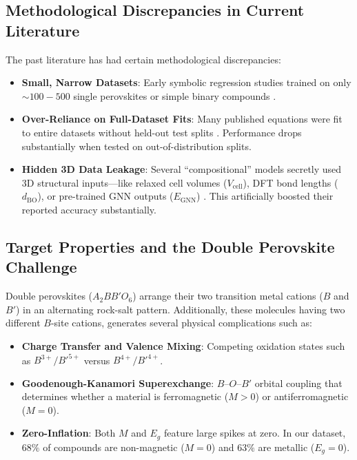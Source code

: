 \documentclass[12pt,onecolumn]{elsarticle}
\begin{document}
\subsection{Methodological Discrepancies in Current Literature}
The past literature has had certain methodological discrepancies:
\begin{itemize}
\item \textbf{Small, Narrow Datasets}: Early symbolic regression studies trained on only $\sim 100 - 500$ single perovskites or simple binary compounds \cite{ghiringhelli2015bigdata, bartel2019new}.
\item \textbf{Over-Reliance on Full-Dataset Fits}: Many published equations were fit to entire datasets without held-out test splits \cite{ouyang2018sisso, ghiringhelli2015bigdata, rissanen1978modeling}. Performance drops substantially when tested on out-of-distribution splits.
\item \textbf{Hidden 3D Data Leakage}: Several ``compositional'' models secretly used 3D structural inputs—like relaxed cell volumes ($V_{\text{cell}}$), DFT bond lengths ($d_{\text{BO}}$), or pre-trained GNN outputs ($E_{\text{GNN}}$) \cite{chgnet, kirklin2015open, hautier2012accuracy}. This artificially boosted their reported accuracy substantially.
\end{itemize}

\subsection{Target Properties and the Double Perovskite Challenge}
Double perovskites ($A_2BB'O_6$) arrange their two transition metal cations ($B$ and $B'$) in an alternating rock-salt pattern. Additionally, these molecules having two different $B$-site cations, generates several physical complications such as:
\begin{itemize}
\item \textbf{Charge Transfer and Valence Mixing}: Competing oxidation states such as $B^{3+}/B'^{5+}$ versus $B^{4+}/B'^{4+}$.
\item \textbf{Goodenough-Kanamori Superexchange}: $B\text{--}O\text{--}B'$ orbital coupling that determines whether a material is ferromagnetic ($M > 0$) or antiferromagnetic ($M = 0$).
\item \textbf{Zero-Inflation}: Both $M$ and $E_g$ feature large spikes at zero. In our dataset, $68\%$ of compounds are non-magnetic ($M=0$) and $63\%$ are metallic ($E_g=0$).
\end{itemize}
\end{document}
